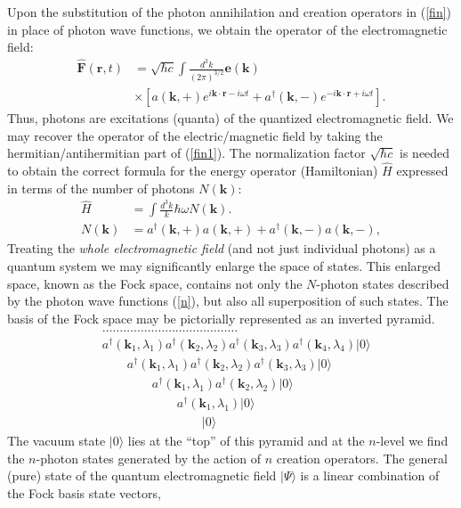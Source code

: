 \documentclass[onecolumn,aps,pra,12pt]{revtex4-1}
\begin{document}
Upon the substitution of the photon annihilation and creation operators in (\ref{fin}) in place of photon wave functions, we obtain the operator of the electromagnetic field:
\begin{align}\label{fin1}
{\hat{\bm F}}(\bm r,t)&=\sqrt{\hbar c}\int\!\frac{d^3k}{(2\pi)^{3/2}}{\bm e}(\bm k)\nonumber\\
&\times\left[a({\bm k},+)e^{i\bm k\cdot\bm r-i\omega t}+a^\dagger({\bm k},-)e^{-i\bm k\cdot\bm r+i\omega t}\right].
\end{align}
Thus, photons are excitations (quanta) of the quantized electromagnetic field. We may recover the operator of the electric/magnetic field by taking the hermitian/antihermitian part of (\ref{fin1}). The normalization factor $\sqrt{\hbar c}$ is needed to obtain the correct formula for the energy operator (Hamiltonian) $\hat{H}$ expressed in terms of the number of photons $N(\bm k)$:
\begin{align}
\hat{H}&=\int\!\frac{d^3k}{k}\hbar\omega N(\bm k).\label{ham}\\
N(\bm k)&=a^\dagger({\bm k},+)a({\bm k},+)+a^\dagger({\bm k},-)a({\bm k},-),\label{nn}
\end{align}
Treating the {\em whole electromagnetic field} (and not just individual photons) as a quantum system we may significantly enlarge the space of states. This enlarged space, known as the Fock space, contains not only the $N$-photon states described by the photon wave functions (\ref{n}), but also all superposition of such states. The basis of the Fock space may be pictorially represented as an inverted pyramid.
\begin{align}\label{fock}
&\dots\dots\dots\dots\dots\dots\dots\dots\dots\dots\dots\dots\dots\nonumber\\
&a^\dagger({\bm k}_1,\lambda_1)a^\dagger({\bm k}_2,\lambda_2)a^\dagger({\bm k}_3,\lambda_3)a^\dagger({\bm k}_4,\lambda_4)|0\rangle\nonumber\\
&\quad\quad a^\dagger({\bm k}_1,\lambda_1)a^\dagger({\bm k}_2,\lambda_2)a^\dagger({\bm k}_3,\lambda_3)|0\rangle\nonumber\\
&\quad\quad\quad\quad a^\dagger({\bm k}_1,\lambda_1)a^\dagger({\bm k}_2,\lambda_2)|0\rangle\nonumber\\
&\quad\quad\quad\quad\quad\quad a^\dagger({\bm k}_1,\lambda_1)|0\rangle\nonumber\\
&\quad\quad\quad\quad\quad\quad\quad\quad|0\rangle
\end{align}
The vacuum state $|0\rangle$ lies at the ``top'' of this pyramid and at the $n$-level we find the $n$-photon states generated by the action of $n$ creation operators. The general (pure) state of the quantum electromagnetic field $|\Psi\rangle$ is a linear combination of the Fock basis state vectors,
\end{document}
